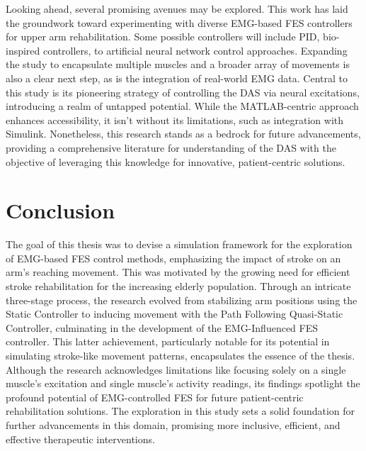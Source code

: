Looking ahead, several promising avenues may be explored.  This work has laid the groundwork toward experimenting with diverse EMG-based FES controllers for upper arm rehabilitation. Some possible controllers will include PID, bio-inspired controllers, to artificial neural network control approaches. Expanding the study to encapsulate multiple muscles and a broader array of movements is also a clear next step, as is the integration of real-world EMG data. Central to this study is its pioneering strategy of controlling the DAS via neural excitations, introducing a realm of untapped potential. While the MATLAB-centric approach enhances accessibility, it isn't without its limitations, such as integration with Simulink. Nonetheless, this research stands as a bedrock for future advancements, providing a comprehensive literature for understanding of the DAS with the objective of leveraging this knowledge for innovative, patient-centric solutions.

\chapter{Conclusion}

The goal of this thesis was to devise a simulation framework for the exploration of EMG-based FES control methods, emphasizing the impact of stroke on an arm's reaching movement. This was motivated by the growing need for efficient stroke rehabilitation for the increasing elderly population. Through an intricate three-stage process, the research evolved from stabilizing arm positions using the Static Controller to inducing movement with the Path Following Quasi-Static Controller, culminating in the development of the EMG-Influenced FES controller. This latter achievement, particularly notable for its potential in simulating stroke-like movement patterns, encapsulates the essence of the thesis. Although the research acknowledges limitations like focusing solely on a single muscle's excitation and single muscle's activity readings, its findings spotlight the profound potential of EMG-controlled FES for future patient-centric rehabilitation solutions. The exploration in this study sets a solid foundation for further advancements in this domain, promising more inclusive, efficient, and effective therapeutic interventions.